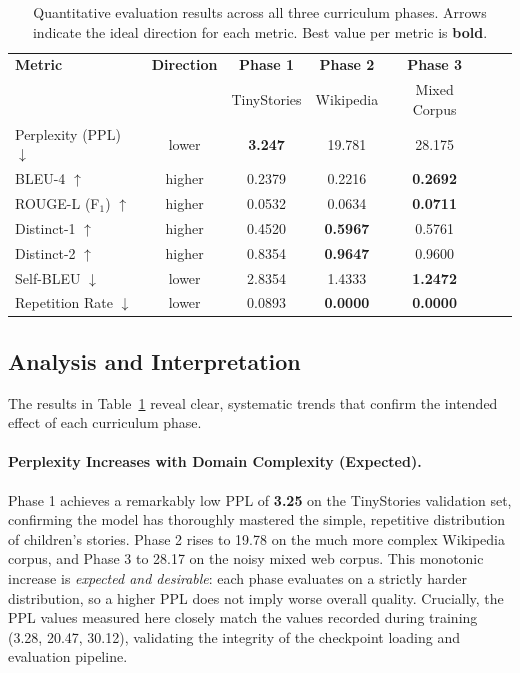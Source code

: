 \documentclass[12pt]{article}
\begin{document}
\begin{table}[ht]
\centering
\caption{Quantitative evaluation results across all three curriculum phases. Arrows indicate the ideal direction for each metric. Best value per metric is \textbf{bold}.}
\label{tab:quant_results}
\renewcommand{\arraystretch}{1.35}
\begin{tabular}{lcccccc}
\toprule
\textbf{Metric} & \textbf{Direction} & \textbf{Phase 1} & \textbf{Phase 2} & \textbf{Phase 3} \\
 & & TinyStories & Wikipedia & Mixed Corpus \\
\midrule
Perplexity (PPL) $\downarrow$      & lower & \textbf{3.247}  & 19.781         & 28.175         \\
BLEU-4 $\uparrow$                  & higher & 0.2379         & 0.2216         & \textbf{0.2692}\\
ROUGE-L (F$_1$) $\uparrow$         & higher & 0.0532         & 0.0634         & \textbf{0.0711}\\
Distinct-1 $\uparrow$              & higher & 0.4520         & \textbf{0.5967}& 0.5761         \\
Distinct-2 $\uparrow$              & higher & 0.8354         & \textbf{0.9647}& 0.9600         \\
Self-BLEU $\downarrow$             & lower  & 2.8354         & 1.4333         & \textbf{1.2472}\\
Repetition Rate $\downarrow$       & lower  & 0.0893         & \textbf{0.0000}& \textbf{0.0000}\\
\bottomrule
\end{tabular}
\end{table}

\subsection{Analysis and Interpretation}

The results in Table~\ref{tab:quant_results} reveal clear, systematic trends that confirm the intended effect of each curriculum phase.

\paragraph{Perplexity Increases with Domain Complexity (Expected).}
Phase 1 achieves a remarkably low PPL of \textbf{3.25} on the TinyStories validation set, confirming the model has thoroughly mastered the simple, repetitive distribution of children's stories. Phase 2 rises to 19.78 on the much more complex Wikipedia corpus, and Phase 3 to 28.17 on the noisy mixed web corpus. This monotonic increase is \emph{expected and desirable}: each phase evaluates on a strictly harder distribution, so a higher PPL does not imply worse overall quality. Crucially, the PPL values measured here closely match the values recorded during training (3.28, 20.47, 30.12), validating the integrity of the checkpoint loading and evaluation pipeline.
\end{document}
